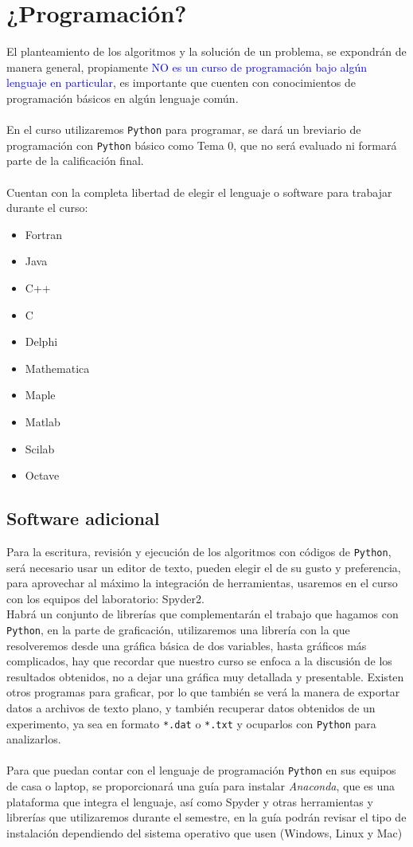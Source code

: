 \documentclass[12pt]{article}
\begin{document}
\section{¿Programación?}
El planteamiento de los algoritmos y la solución de un problema, se expondrán de manera general, propiamente \textcolor{blue}{NO es un curso de programación bajo algún lenguaje en particular}, es importante que cuenten con conocimientos de programación básicos en algún lenguaje común.
\\
\\
En el curso utilizaremos \texttt{Python} para programar, se dará un breviario de programación con \texttt{Python} básico como Tema 0, que no será evaluado ni formará parte de la calificación final.
\\
\\
Cuentan con la completa libertad de elegir el lenguaje o software para trabajar durante el curso:
\begin{multicols}{2}
\begin{itemize}
\item Fortran
\item Java
\item C++
\item C
\item Delphi
\item Mathematica
\item Maple
\item Matlab
\item Scilab
\item Octave
\end{itemize}
\end{multicols}
\subsection{Software adicional}
Para la escritura, revisión y ejecución de los algoritmos con códigos de \texttt{Python}, será necesario usar un editor de texto, pueden elegir el de su gusto y preferencia, para aprovechar al máximo la integración de herramientas, usaremos en el curso con los equipos del laboratorio: Spyder2.
\\
Habrá un conjunto de librerías que complementarán el trabajo que hagamos con \texttt{Python}, en la parte de graficación, utilizaremos una librería con la que resolveremos desde una gráfica básica de dos variables, hasta gráficos más complicados, hay que recordar que nuestro curso se enfoca a la discusión de los resultados obtenidos, no a dejar una gráfica muy detallada y presentable. Existen otros programas para graficar, por lo que también se verá la manera de exportar datos a archivos de texto plano, y también recuperar datos obtenidos de un experimento, ya sea en formato \texttt{*.dat} o \texttt{*.txt} y ocuparlos con \texttt{Python} para analizarlos.
\\
\\
Para que puedan contar con el lenguaje de programación \texttt{Python} en sus equipos de casa o laptop, se proporcionará una guía para instalar \emph{Anaconda}, que es una plataforma que integra el lenguaje, así como Spyder y otras herramientas y librerías que utilizaremos durante el semestre, en la guía podrán revisar el tipo de instalación dependiendo del sistema operativo que usen (Windows, Linux y Mac)
\end{document}
